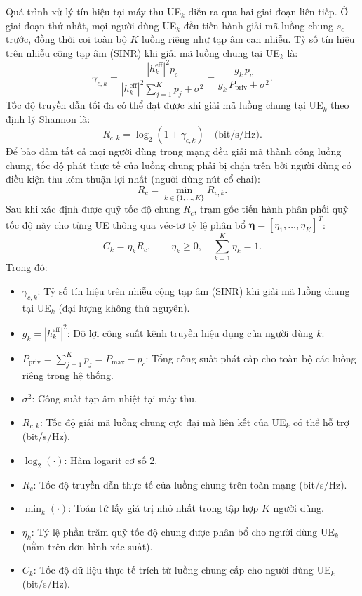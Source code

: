Quá trình xử lý tín hiệu tại máy thu UE$_k$ diễn ra qua hai giai đoạn liên tiếp. Ở giai đoạn thứ nhất, mọi
người dùng UE$_k$ đều tiến hành giải mã luồng chung $s_c$ trước, đồng thời coi toàn bộ $K$ luồng riêng như
tạp âm can nhiễu. Tỷ số tín hiệu trên nhiễu cộng tạp âm (SINR) khi giải mã luồng chung tại UE$_k$ là:
\begin{equation}
\gamma_{c,k} = \frac{|h^{\mathrm{eff}}_k|^2 p_c}{|h^{\mathrm{eff}}_k|^2 \sum_{j=1}^{K} p_j + \sigma^2}
= \frac{g_k\, p_c}{g_k\, P_{\mathrm{priv}} + \sigma^2} .
\label{eq:sinr-chung}
\end{equation}
Tốc độ truyền dẫn tối đa có thể đạt được khi giải mã luồng chung tại UE$_k$ theo định lý Shannon là:
\begin{equation}
R_{c,k} = \log_2(1 + \gamma_{c,k}) \quad \text{(bit/s/Hz)}.
\label{eq:toc-do-chung-k}
\end{equation}
Để bảo đảm tất cả mọi người dùng trong mạng đều giải mã thành công luồng chung, tốc độ phát thực tế của
luồng chung phải bị chặn trên bởi người dùng có điều kiện thu kém thuận lợi nhất (người dùng nút cổ chai):
\begin{equation}
R_c = \min_{k \in \{1, \dots, K\}} R_{c,k} .
\label{eq:toc-do-chung}
\end{equation}
Sau khi xác định được quỹ tốc độ chung $R_c$, trạm gốc tiến hành phân phối quỹ tốc độ này cho từng UE thông
qua véc-tơ tỷ lệ phân bổ $\boldsymbol{\eta} = [\eta_1, \dots, \eta_K]^T$:
\begin{equation}
C_k = \eta_k R_c, \qquad \eta_k \ge 0, \quad \sum_{k=1}^{K} \eta_k = 1 .
\label{eq:chia-toc-do-chung}
\end{equation}
Trong đó:
\begin{itemize}
\item $\gamma_{c,k}$: Tỷ số tín hiệu trên nhiễu cộng tạp âm (SINR) khi giải mã luồng chung tại UE$_k$ (đại
  lượng không thứ nguyên).
\item $g_k = |h^{\mathrm{eff}}_k|^2$: Độ lợi công suất kênh truyền hiệu dụng của người dùng $k$.
\item $P_{\mathrm{priv}} = \sum_{j=1}^{K} p_j = P_{\max} - p_c$: Tổng công suất phát cấp cho toàn bộ các luồng
  riêng trong hệ thống.
\item $\sigma^2$: Công suất tạp âm nhiệt tại máy thu.
\item $R_{c,k}$: Tốc độ giải mã luồng chung cực đại mà liên kết của UE$_k$ có thể hỗ trợ (bit/s/Hz).
\item $\log_2(\cdot)$: Hàm logarit cơ số 2.
\item $R_c$: Tốc độ truyền dẫn thực tế của luồng chung trên toàn mạng (bit/s/Hz).
\item $\min_k(\cdot)$: Toán tử lấy giá trị nhỏ nhất trong tập hợp $K$ người dùng.
\item $\eta_k$: Tỷ lệ phần trăm quỹ tốc độ chung được phân bổ cho người dùng UE$_k$ (nằm trên đơn hình xác
  suất).
\item $C_k$: Tốc độ dữ liệu thực tế trích từ luồng chung cấp cho người dùng UE$_k$ (bit/s/Hz).
\end{itemize}

